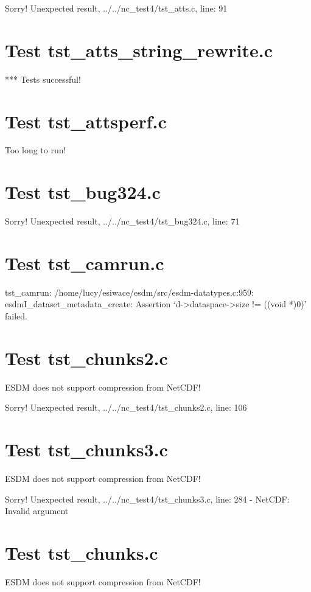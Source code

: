 Sorry! Unexpected result, ../../nc\_test4/tst\_atts.c, line: 91

\section{Test tst\_atts\_string\_rewrite.c}

*** Tests successful!

\section{Test tst\_attsperf.c}

Too long to run!

\section{Test tst\_bug324.c}

Sorry! Unexpected result, ../../nc\_test4/tst\_bug324.c, line: 71

\section{Test tst\_camrun.c}

tst\_camrun: /home/lucy/esiwace/esdm/src/esdm-datatypes.c:959: esdmI\_dataset\_metadata\_create: Assertion `d->dataspace->size != ((void *)0)' failed.

\section{Test tst\_chunks2.c}

ESDM does not support compression from NetCDF!

Sorry! Unexpected result, ../../nc\_test4/tst\_chunks2.c, line: 106

\section{Test tst\_chunks3.c}

ESDM does not support compression from NetCDF!

Sorry! Unexpected result, ../../nc\_test4/tst\_chunks3.c, line: 284 - NetCDF: Invalid argument

\section{Test tst\_chunks.c}

ESDM does not support compression from NetCDF!

